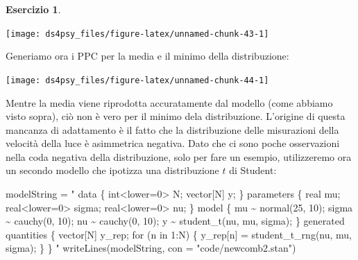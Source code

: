 \documentclass[
  11pt,
]{krantz}
\makeatletter
\newenvironment{Shaded}{\begin{snugshade}}{\end{snugshade}}
\newcommand{\AttributeTok}[1]{\textcolor[rgb]{0.61,0.61,0.61}{#1}}
\newcommand{\FunctionTok}[1]{\textcolor[rgb]{0,0,0}{#1}}
\newcommand{\NormalTok}[1]{#1}
\newcommand{\OtherTok}[1]{\textcolor[rgb]{0.37,0.37,0.37}{#1}}
\newcommand{\SpecialCharTok}[1]{\textcolor[rgb]{0,0,0}{#1}}
\newcommand{\StringTok}[1]{\textcolor[rgb]{0.5,0.5,0.5}{#1}}
\newenvironment{kframe}{%
\medskip{}
\setlength{\fboxsep}{.8em}
 \def\at@end@of@kframe{}%
 \ifinner\ifhmode%
  \def\at@end@of@kframe{\end{minipage}}%
  \begin{minipage}{\columnwidth}%
 \fi\fi%
 \def\FrameCommand##1{\hskip\@totalleftmargin \hskip-\fboxsep
 \colorbox{shadecolor}{##1}\hskip-\fboxsep
     \hskip-\linewidth \hskip-\@totalleftmargin \hskip\columnwidth}%
 \MakeFramed {\advance\hsize-\width
   \@totalleftmargin\z@ \linewidth\hsize
   \@setminipage}}%
 {\par\unskip\endMakeFramed%
 \at@end@of@kframe}
\renewenvironment{Shaded}{\begin{kframe}}{\end{kframe}}
\theoremstyle{definition}
\theoremstyle{definition}
\theoremstyle{definition}
\newtheorem{exercise}{Esercizio}[chapter]
\theoremstyle{definition}
\theoremstyle{remark}
\makeatother
\begin{document}
\begin{exercise}
\begin{center}\texttt{[image: ds4psy\_files/figure-latex/unnamed-chunk-43-1]} \end{center}

Generiamo ora i PPC per la media e il minimo della distribuzione:

\begin{Shaded}
\end{Shaded}

\begin{center}\texttt{[image: ds4psy\_files/figure-latex/unnamed-chunk-44-1]} \end{center}

Mentre la media viene riprodotta accuratamente dal modello (come abbiamo visto sopra), ciò non è vero per il minimo dela distribuzione. L'origine di questa mancanza di adattamento è il fatto che la distribuzione delle misurazioni della velocità della luce è asimmetrica negativa. Dato che ci sono poche osservazioni nella coda negativa della distribuzione, solo per fare un esempio, utilizzeremo ora un secondo modello che ipotizza una distribuzione \(t\) di Student:

\begin{Shaded}
\begin{Highlighting}[]
\NormalTok{modelString }\OtherTok{=} \StringTok{"}
\StringTok{data \{}
\StringTok{  int\textless{}lower=0\textgreater{} N;}
\StringTok{  vector[N] y;}
\StringTok{\}}
\StringTok{parameters \{}
\StringTok{  real mu;}
\StringTok{  real\textless{}lower=0\textgreater{} sigma;}
\StringTok{  real\textless{}lower=0\textgreater{} nu;}
\StringTok{\}}
\StringTok{model \{}
\StringTok{  mu \textasciitilde{} normal(25, 10);}
\StringTok{  sigma \textasciitilde{} cauchy(0, 10);}
\StringTok{  nu \textasciitilde{} cauchy(0, 10);}
\StringTok{  y \textasciitilde{} student\_t(nu, mu, sigma);}
\StringTok{\}}
\StringTok{generated quantities \{}
\StringTok{  vector[N] y\_rep;}
\StringTok{  for (n in 1:N) \{}
\StringTok{    y\_rep[n] = student\_t\_rng(nu, mu, sigma);}
\StringTok{  \}}
\StringTok{\}}
\StringTok{"}
\FunctionTok{writeLines}\NormalTok{(modelString, }\AttributeTok{con =} \StringTok{"code/newcomb2.stan"}\NormalTok{)}
\end{Highlighting}
\end{Shaded}


\end{exercise}
\end{document}
